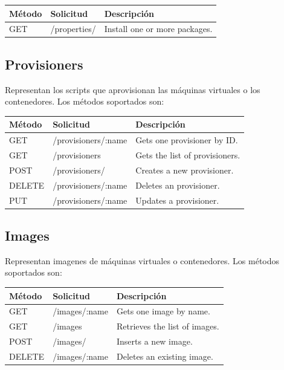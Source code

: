 \documentclass[conference, spanish]{IEEEtran}
\begin{document}
\begin{center}
 \begin{tabular}{| l | l | l |}
 \hline
  \textbf{Método} & \textbf{Solicitud} & \textbf{Descripción} \\ [0.5ex] 
  \hline\hline
  GET & /properties/ & Install one or more packages. \\ [1ex] 
  \hline
\end{tabular}
\end{center}


\subsection{Provisioners}
Representan los scripts que aprovisionan las máquinas virtuales o los contenedores. Los métodos soportados son:

\begin{center}
 \begin{tabular}{| l | l | l |}
 \hline
  \textbf{Método} & \textbf{Solicitud} & \textbf{Descripción} \\ [0.5ex] 
  \hline\hline
  GET & /provisioners/:name & Gets one provisioner by ID. \\
  \hline
  GET & /provisioners & Gets the list of provisioners. \\
  \hline  
  POST & /provisioners/ & Creates a new provisioner. \\
  \hline
  DELETE & /provisioners/:name & Deletes an provisioner. \\
  \hline  
  PUT & /provisioners/:name & Updates a provisioner. \\ [1ex] 
  \hline
\end{tabular}
\end{center}

\subsection{Images}
Representan imagenes de máquinas virtuales o contenedores. Los métodos soportados son:

\begin{center}
 \begin{tabular}{| l | l | l |}
 \hline
  \textbf{Método} & \textbf{Solicitud} & \textbf{Descripción} \\ [0.5ex] 
  \hline\hline
  GET & /images/:name & Gets one image by name. \\
  \hline
  GET & /images & Retrieves the list of images. \\
  \hline  
  POST & /images/ & Inserts a new image. \\
  \hline
  DELETE & /images/:name & Deletes an existing image. \\ [1ex] 
  \hline
\end{tabular}
\end{center}
\end{document}
